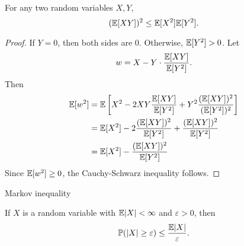 %
\begin{note}
  \begin{field}
    \begin{thm}
      For any two random variables $X, Y$,
      \[
        (\mathbb{E}[XY])^2 \leq \mathbb{E}[X^2]\mathbb{E}[Y^2].
      \]
    \end{thm}
  \end{field}
  \begin{field}
    \begin{proof}
      If $Y = 0$, then both sides are $0$. Otherwise, $\mathbb{E}[Y^2] > 0$. Let
      \[
        w = X - Y\cdot \frac{\mathbb{E}[XY]}{\mathbb{E}[Y^2]}.
      \]
      Then
      \begin{align*}
        \mathbb{E}[w^2] &= \mathbb{E}\left[X^2 - 2XY\frac{\mathbb{E}[XY]}{\mathbb{E}[Y^2]} + Y^2\frac{(\mathbb{E}[XY])^2}{(\mathbb{E}[Y^2])^2}\right]\\
        &= \mathbb{E}[X^2] - 2\frac{(\mathbb{E}[XY])^2}{\mathbb{E}[Y^2]} + \frac{(\mathbb{E}[XY])^2}{\mathbb{E}[Y^2]}\\
        &= \mathbb{E}[X^2] - \frac{(\mathbb{E}[XY])^2}{\mathbb{E}[Y^2]}
      \end{align*}
      Since $\mathbb{E}[w^2] \geq 0$, the Cauchy-Schwarz inequality follows.
    \end{proof}
  \end{field}
  \xplain{}%
\end{note}

%
\begin{note}
  \begin{field}
    Markov inequality
  \end{field}
  \begin{field}
    \begin{thm}
      If $X$ is a random variable with $\mathbb{E}|X| < \infty$ and $\varepsilon > 0$, then
      \[
        \mathbb{P}(|X| \geq \varepsilon) \leq \frac{\mathbb{E}|X|}{\varepsilon}.
      \]
    \end{thm}
  \end{field}
  \xplain{}%
\end{note}

